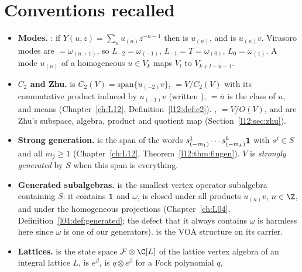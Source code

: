 \section{Conventions recalled}\label{l18:sec:conv}

\begin{itemize}
\item \textbf{Modes.} : if $Y(u,z)=\sum_n u_{(n)}z^{-n-1}$ then
   is $u_{(n)}$, and  is $u_{(n)}v$. Virasoro modes are
   $=\omega_{(n+1)}$, so $L_{-2}=\omega_{(-1)}$, $L_{-1}=T=\omega_{(0)}$,
  $L_0=\omega_{(1)}$. A mode $u_{(n)}$ of a homogeneous $u\in V_k$ maps $V_l$ to $V_{k+l-n-1}$.
\item \textbf{$C_2$ and Zhu.}  is $C_2(V)=\mathrm{span}\{u_{(-2)}v\}$,
   $=V/C_2(V)$ with its commutative product induced by $u_{(-1)}v$ (written
  ),  $=\bar u$ is the class of $u$, and
   means  (Chapter~\ref{ch:L12},
  Definition~\ref{l12:def:c2}). ,  $=V/O(V)$,  and  are
  Zhu's subspace, algebra, product and quotient map (Section~\ref{l12:sec:zhu}).
\item \textbf{Strong generation.}  is the span of the words
  $s^1_{(-m_1)}\cdots s^k_{(-m_k)}\mathbf{1}$ with $s^j\in S$ and all $m_j\ge1$
  (Chapter~\ref{ch:L12}, Theorem~\ref{l12:thm:fingen}). $V$ is \emph{strongly generated} by $S$ when
  this span is everything.
\item \textbf{Generated subalgebras.}  is the smallest vertex
  operator subalgebra containing $S$: it contains $\mathbf{1}$ and $\omega$, is closed under all
  products $u_{(n)}v$, $n\in\Z$, and under the homogeneous projections
  (Chapter~\ref{ch:L04}, Definition~\ref{l04:def:generated}; the defect that it always contains
  $\omega$ is harmless here since $\omega$ is one of our generators).
   is the VOA structure on its carrier.
\item \textbf{Lattices.}  is the state space $\mathcal F\otimes\C[L]$ of the
  lattice vertex algebra of an integral lattice $L$,  is $e^\beta$,
   is $q\otimes e^\beta$ for a Fock polynomial $q$, 

\end{itemize}
